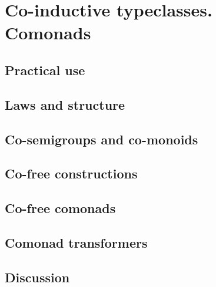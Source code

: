 
\chapter{Co-inductive typeclasses. Comonads}

\section{Practical use}

\section{Laws and structure}

\section{Co-semigroups and co-monoids}

\section{Co-free constructions}

\section{Co-free comonads}

\section{Comonad transformers}

\section{Discussion}

\begin{comment}
\end{comment}

